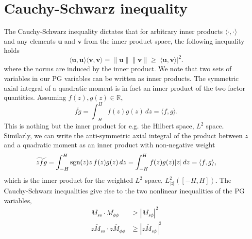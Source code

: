 \section{Cauchy-Schwarz inequality}

The Cauchy-Schwarz inequality dictates that for arbitrary inner products $\langle \cdot, \cdot \rangle$ and any elements $\mathbf{u}$ and $\mathbf{v}$ from the inner product space, the following inequality holds
%
\begin{equation}\label{eqn:cauchy-schwarz}
    \langle \mathbf{u}, \mathbf{u} \rangle \langle \mathbf{v}, \mathbf{v} \rangle = \| \mathbf{u} \| \| \mathbf{v} \| \geq |\langle \mathbf{u}, \mathbf{v} \rangle|^2.
\end{equation}
%
where the norms are induced by the inner product. We note that two sets of variables in our PG variables can be written as inner products. The symmetric axial integral of a quadratic moment is in fact an inner product of the two factor quantities. Assuming $f(z), g(z) \in \mathbb{R}$,
%
\begin{equation}
    \overline{f g} = \int_{-H}^H f(z) g(z)\, dz = \langle f, g \rangle.
\end{equation}
%
This is nothing but the inner product for e.g. the Hilbert space, $L^2$ space. Similarly, we can write the anti-symmetric axial integral of the product between $z$ and a quadratic moment as an inner product with non-negative weight
%
\begin{equation}
    \widetilde{z f g} = \int_{-H}^H \operatorname{sgn}(z)z \, f(z) g(z)\, dz = \int_{-H}^H f(z) g(z) |z|\, dz = \langle f, g \rangle,
\end{equation}
%
which is the inner product for the weighted $L^2$ space, $L^2_{|z|}([-H, H])$. The Cauchy-Schwarz inequalities give rise to the two nonlinear inequalities of the PG variables,
%
\begin{equation}
    \begin{aligned}
        \overline{M_{ss}} \cdot \overline{M_{\phi\phi}} &\geq \left|\overline{M_{s\phi}}\right|^2 \\ 
        \widetilde{zM_{ss}} \cdot \widetilde{zM_{\phi\phi}} &\geq \left|\widetilde{zM_{s\phi}}\right|^2
    \end{aligned}
\end{equation}
%


